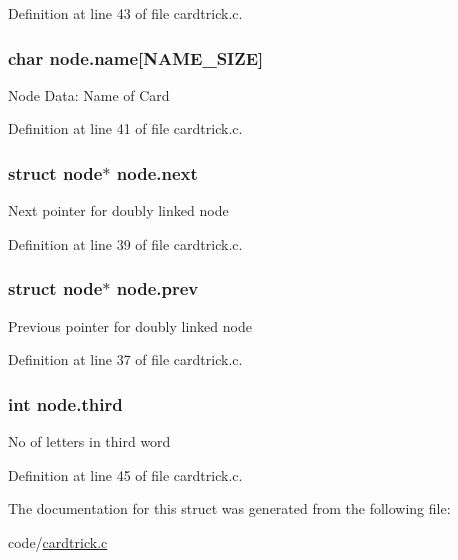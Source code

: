 Definition at line 43 of file cardtrick.c.

\hypertarget{structnode_af67fef838619da259b5c424c8fe5f718}{
\subsubsection[{name}]{\setlength{\rightskip}{0pt plus 5cm}char {\bf node.name}\mbox{[}NAME\_\-SIZE\mbox{]}}}
\label{structnode_af67fef838619da259b5c424c8fe5f718}
Node Data: Name of Card 

Definition at line 41 of file cardtrick.c.

\hypertarget{structnode_ad465c36cd29be2935f9e1bee1a3eaa03}{
\subsubsection[{next}]{\setlength{\rightskip}{0pt plus 5cm}struct {\bf node}$\ast$ {\bf node.next}}}
\label{structnode_ad465c36cd29be2935f9e1bee1a3eaa03}
Next pointer for doubly linked node 

Definition at line 39 of file cardtrick.c.

\hypertarget{structnode_a23dd2ff244acbbf20ec4408f81d76d9c}{
\subsubsection[{prev}]{\setlength{\rightskip}{0pt plus 5cm}struct {\bf node}$\ast$ {\bf node.prev}}}
\label{structnode_a23dd2ff244acbbf20ec4408f81d76d9c}
Previous pointer for doubly linked node 

Definition at line 37 of file cardtrick.c.

\hypertarget{structnode_ae9b51f363ea789f5f6ec2fbc0b2a8086}{
\subsubsection[{third}]{\setlength{\rightskip}{0pt plus 5cm}int {\bf node.third}}}
\label{structnode_ae9b51f363ea789f5f6ec2fbc0b2a8086}
No of letters in third word 

Definition at line 45 of file cardtrick.c.



The documentation for this struct was generated from the following file:\begin{DoxyCompactItemize}
\item 
code/\hyperlink{cardtrick_8c}{cardtrick.c}\end{DoxyCompactItemize}
